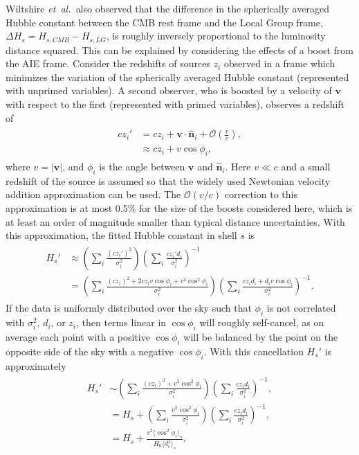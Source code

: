 \documentclass[a4paper,12pt]{report}
\newcommand{\uvec}[1]{\hat{\bm{#1}}}
\renewcommand{\vec}[1]{\ensuremath{\bm{#1}}}
\newcommand{\etal}{\emph{et~al.\ }}
\begin{document}
Wiltshire \etal also observed that the difference in the spherically averaged Hubble constant between the CMB rest frame and the Local Group frame, $\Delta H_s = H_{s,CMB} - H_{s,LG}$, is roughly inversely proportional to the luminosity distance squared. This can be explained by considering the effects of a boost from the AIE frame. Consider the redshifts of sources $z_i$ observed in a frame which minimizes the variation of the spherically averaged Hubble constant (represented with unprimed variables). A second observer, who is boosted by a velocity of $\vec{v}$ with respect to the first (represented with primed variables), observes a redshift of
\begin{align}
\begin{split}
  cz_i' &= cz_i + \vec{v} \cdot \uvec{n}_i + \mathcal{O}(\frac{v}{c}),\\
    &\approx cz_i + v\cos\phi_i,
\end{split}
\end{align}
where $v = |\vec{v}|$, and $\phi_i$ is the angle between $\vec{v}$ and $\uvec{n}_i$. Here $v \ll c$ and a small redshift of the source is assumed so that the widely used Newtonian velocity addition approximation can be used. The $\mathcal{O}(v/c)$ correction to this approximation is at most 0.5\% for the size of the boosts considered here, which is at least an order of magnitude smaller than typical distance uncertainties. With this approximation, the fitted Hubble constant in shell $s$ is
\begin{align}
\begin{split}
  H_s' &\approx \left(\sum_{i} \frac{(cz_i')^2}{\sigma_i^2}\right)\left(\sum_i \frac{cz_i'd_i}{\sigma_i^2}\right)^{-1}\\
      &= \left(\sum_{i} \frac{(cz_i)^2+2cz_iv\cos\phi_i+v^2\cos^2\phi_i}{\sigma_i^2}\right)\left(\sum_i \frac{cz_id_i+d_iv\cos\phi_i}{\sigma_i^2}\right)^{-1}.
\end{split}
\end{align}
If the data is uniformly distributed over the sky such that $\phi_i$ is not correlated with $\sigma_i^2$, $d_i$, or $z_i$, then terms linear in $\cos\phi_i$ will roughly self-cancel, as on average each point with a positive $\cos\phi_i$ will be balanced by the point on the opposite side of the sky with a negative $\cos\phi_i$. With this cancellation $H_s'$ is approximately
\begin{align}
\begin{split}
  H_s' &\sim \left(\sum_{i} \frac{(cz_i)^2+v^2\cos^2\phi_i}{\sigma_i^2}\right)\left(\sum_i \frac{cz_id_i}{\sigma_i^2}\right)^{-1}, \\
  &= H_s + \left(\sum_{i} \frac{v^2\cos^2\phi_i}{\sigma_i^2}\right)\left(\sum_i \frac{cz_id_i}{\sigma_i^2}\right)^{-1}, \\
  &= H_s + \frac{v^2 \langle \cos^2\phi_i \rangle_s}{H_0 \langle d^2_i \rangle_s},
\end{split}
\end{align}
\end{document}
